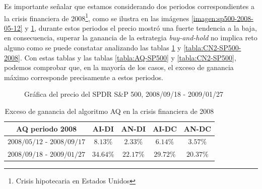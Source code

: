 \documentclass[12pt]{scrbook}
\theoremstyle{break}
\theoremstyle{break}
\newcommand{\buyhold}{\textit{buy-and-hold} }
\begin{document}
Es importante señalar que estamos considerando dos periodos correspondientes a la crisis financiera de 2008\footnote{Crisis hipotecaria en Estados Unidos}, como se ilustra en las imágenes \ref{imagen:sp500-2008-05-12} y \ref{imagen:sp500-2008-09-18}, durante estos periodos el precio mostró una fuerte tendencia a la baja, en consecuencia, superar la ganancia de la estrategia \buyhold no implica reto alguno como se puede constatar analizando las tablas \ref{tabla:AQ-SP500-2008} y \ref{tabla:CN2-SP500-2008}. Con estas tablas y las tablas \ref{tabla:AQ-SP500} y \ref{tabla:CN2-SP500}, podemos comprobar que, en la mayoría de los casos, el exceso de ganancia máximo corresponde precisamente a estos periodos.

\begin{figure}[htbp]
\centering
{}
\caption{\label{imagen:sp500-2008-09-18} Gráfica del precio del SPDR S\&P 500, 2008/09/18 - 2009/01/27}
\end{figure}

\begin{center}
\begin{table}[htbp]
\centering
\begin{tabular}{ccccc}
\hline
\textbf{AQ periodo 2008} & \textbf{AI-DI} & \textbf{AN-DI} & \textbf{AI-DC} & \textbf{AN-DC} \\
\hline
$2008/05/12$ - $2008/09/17$ & $8.13\%$ & $2.33\%$ & $6.14\%$ & $3.57\%$ \\
$2008/09/18$ - $2009/01/27$ & $34.64\%$ & $22.17\%$ & $29.72\%$ & $20.37	\%$  \\
\hline
\end{tabular}
\caption{\label{tabla:AQ-SP500-2008} Exceso de ganancia del algoritmo AQ en la crisis financiera de 2008}
\end{table}
\end{center}
\end{document}
